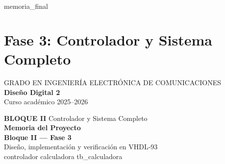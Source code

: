 \documentclass[memoria_final]{subfiles}
\begin{document}
\edef\@currjob{\jobname}
\def\@mainjob{memoria_final}
\ifx\@currjob\@mainjob
  \clearpage
  \part{Fase 3: Controlador y Sistema Completo}
\else
  \hypertarget{inicio}{}

  \begin{titlepage}
    \thispagestyle{empty}

    \vspace*{-1cm}
    \begin{flushleft}
      {\fontsize{9}{12}\selectfont\color{white!80}
        GRADO EN INGENIERÍA ELECTRÓNICA DE COMUNICACIONES}\\[1ex]
      {\fontsize{24}{28}\selectfont\bfseries\color{white}
        Diseño Digital 2}\\[1ex]
      {\fontsize{11}{14}\selectfont\color{white!80}
        Curso académico 2025--2026}
    \end{flushleft}

    \vspace*{0.11\paperheight}
    \begin{center}
      {\Large\color{MainBlue!80}\textbf{BLOQUE II}
        \quad\textbullet\quad Controlador y Sistema Completo}\\[0.8cm]

      {\fontsize{30}{38}\selectfont\bfseries\color{MainBlue}
        Memoria del Proyecto}\\[0.2cm]
      {\fontsize{22}{28}\selectfont\bfseries\color{MainBlue!80}
        Bloque II --- Fase 3}\\[0.5cm]

      {\fontsize{12}{18}\selectfont\color{black!60}
        Diseño, implementación y verificación en VHDL-93}\\[0.2cm]
      {\fontsize{11}{14}\selectfont\ttfamily\color{black!50}
        controlador \quad calculadora \quad tb\_calculadora}\\[0.4cm]


\end{center}
\end{titlepage}
\end{document}

